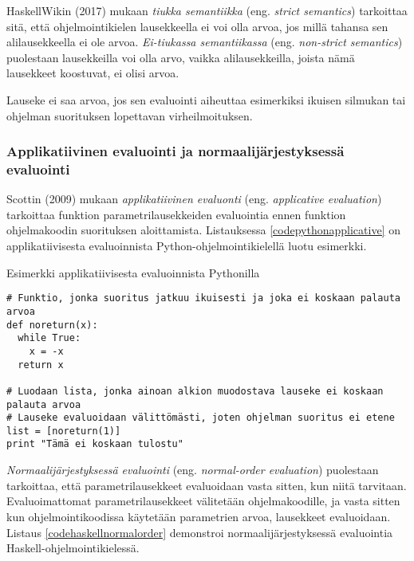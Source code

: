 HaskellWikin (2017) mukaan \textit{tiukka semantiikka} (eng. \textit{strict semantics}) tarkoittaa sitä, että ohjelmointikielen lausekkeella ei voi olla arvoa, jos millä tahansa sen alilausekkeella ei ole arvoa. \textit{Ei-tiukassa semantiikassa} (eng. \textit{non-strict semantics}) puolestaan lausekkeilla voi olla arvo, vaikka alilausekkeilla, joista nämä lausekkeet koostuvat, ei olisi arvoa.

Lauseke ei saa arvoa, jos sen evaluointi aiheuttaa esimerkiksi ikuisen silmukan tai ohjelman suorituksen lopettavan virheilmoituksen.

\subsubsection{Applikatiivinen evaluointi ja normaalijärjestyksessä evaluointi}

Scottin (2009) mukaan \textit{applikatiivinen evaluonti} (eng. \textit{applicative evaluation}) tarkoittaa funktion parametrilausekkeiden evaluointia ennen funktion ohjelmakoodin suorituksen aloittamista. Listauksessa \ref{codepythonapplicative} on applikatiivisesta evaluoinnista Python-ohjelmointikielellä luotu esimerkki.

\begin{listing}[H]
  \caption{Esimerkki applikatiivisesta evaluoinnista Pythonilla}
  \label{codepythonapplicative}
  \bigskip
  \begin{verbatim}
# Funktio, jonka suoritus jatkuu ikuisesti ja joka ei koskaan palauta arvoa
def noreturn(x):
  while True:
    x = -x
  return x

# Luodaan lista, jonka ainoan alkion muodostava lauseke ei koskaan palauta arvoa
# Lauseke evaluoidaan välittömästi, joten ohjelman suoritus ei etene
list = [noreturn(1)]
print "Tämä ei koskaan tulostu"
  \end{verbatim}
\end{listing}

\textit{Normaalijärjestyksessä evaluointi} (eng. \textit{normal-order evaluation}) puolestaan tarkoittaa, että parametrilausekkeet evaluoidaan vasta sitten, kun niitä tarvitaan. Evaluoimattomat parametrilausekkeet välitetään ohjelmakoodille, ja vasta sitten kun ohjelmointikoodissa käytetään parametrien arvoa, lausekkeet evaluoidaan. Listaus \ref{codehaskellnormalorder} demonstroi normaalijärjestyksessä evaluointia Haskell-ohjelmointikielessä.

